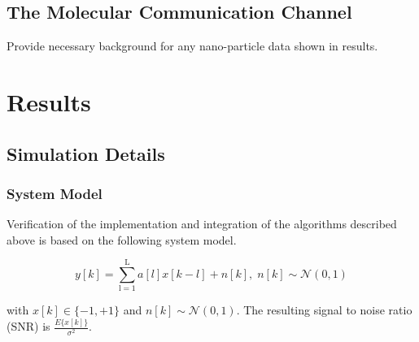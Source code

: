 \documentclass[12pt,a4paper]{report}
\begin{document}
\subsection{The Molecular Communication Channel}
Provide necessary background for any nano-particle data shown in results. 



\section{Results}
\subsection{Simulation Details}
\subsubsection{System Model}
Verification of the implementation and integration of the algorithms described above is based on the following system model.

%


\begin{equation}
y[k] = \sum_{\mathrm{l=1}}^{\mathrm{L}} a[l]x[k-l] + n[k], \; n[k]  \sim \mathcal{N}(0,1)
\end{equation}

with $x[k] \in \{ -1, +1\}$ and $n[k]  \sim \mathcal{N}(0,1)$.  
The resulting signal to noise ratio (SNR) is 
$\frac{E\{x[k]\}}{\sigma^2}$.
\end{document}
